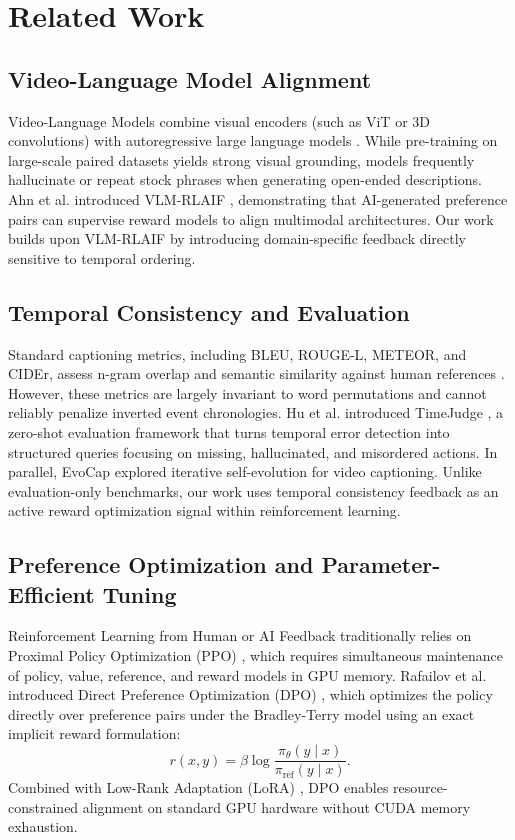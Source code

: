 \documentclass[journal]{IEEEtai}
\begin{document}
\section{Related Work}

\subsection{Video-Language Model Alignment}
Video-Language Models combine visual encoders (such as ViT or 3D convolutions) with autoregressive large language models \cite{xu2016msrvtt}. While pre-training on large-scale paired datasets yields strong visual grounding, models frequently hallucinate or repeat stock phrases when generating open-ended descriptions. Ahn et al. introduced VLM-RLAIF \cite{ahn2024vlm}, demonstrating that AI-generated preference pairs can supervise reward models to align multimodal architectures. Our work builds upon VLM-RLAIF by introducing domain-specific feedback directly sensitive to temporal ordering.

\subsection{Temporal Consistency and Evaluation}
Standard captioning metrics, including BLEU, ROUGE-L, METEOR, and CIDEr, assess n-gram overlap and semantic similarity against human references \cite{xu2016msrvtt,krishna2017densecaptioning}. However, these metrics are largely invariant to word permutations and cannot reliably penalize inverted event chronologies. Hu et al. introduced TimeJudge \cite{hu2025timejudge}, a zero-shot evaluation framework that turns temporal error detection into structured queries focusing on missing, hallucinated, and misordered actions. In parallel, EvoCap \cite{hu2026evocap} explored iterative self-evolution for video captioning. Unlike evaluation-only benchmarks, our work uses temporal consistency feedback as an active reward optimization signal within reinforcement learning.

\subsection{Preference Optimization and Parameter-Efficient Tuning}
Reinforcement Learning from Human or AI Feedback traditionally relies on Proximal Policy Optimization (PPO) \cite{schulman2017ppo}, which requires simultaneous maintenance of policy, value, reference, and reward models in GPU memory. Rafailov et al. introduced Direct Preference Optimization (DPO) \cite{rafailov2023dpo}, which optimizes the policy directly over preference pairs under the Bradley-Terry model  using an exact implicit reward formulation:
\begin{equation}
r(x, y) = \beta \log \frac{\pi_\theta(y \mid x)}{\pi_{\text{ref}}(y \mid x)}.
\label{eq:dpo_reward}
\end{equation}
Combined with Low-Rank Adaptation (LoRA) \cite{hu2022lora}, DPO enables resource-constrained alignment on standard GPU hardware without CUDA memory exhaustion.
\end{document}
